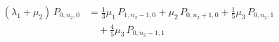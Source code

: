 \[
\begin{aligned}
  (\lambda_{1} + \mu_{2})\,P_{0,n_{2},0} &= \tfrac{1}{3}\mu_{1}\,P_{1,n_{2}-1,0} + \mu_{2}\,P_{0,n_{2}+1,0} + \tfrac{1}{5}\mu_{3}\,P_{0,n_{2},1}\\
  &\quad + \tfrac{4}{5}\mu_{3}\,P_{0,n_{2}-1,1}
\end{aligned}
\]
